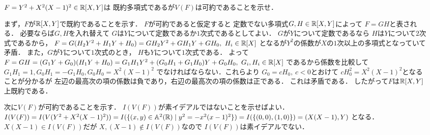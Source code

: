 \begin{prob}
  $F = Y^2 + X^2(X-1)^2 \in \mathbb{R}[X,Y] $は
  既約多項式であるが$V(F)$は可約であることを示せ．
\end{prob}
\begin{ans}
  まず，$F$が$\mathbb{R}[X,Y]$で既約であることを示す．
  $F$が可約であると仮定すると
  定数でない多項式$G,H \in \mathbb{R}[X,Y]$によって
  $F = GH$と表される．
  必要ならば$G,H$を入れ替えて
  $G$は$Y$について定数であるか$1$次式であるとしてよい．
  $G$が$Y$について定数であるなら
  $H$は$Y$について$2$次式であるから，
  $F = G(H_2Y^2 + H_1Y + H_0) = GH_2Y^2 + GH_1Y + GH_0 ,\ H_i \in \mathbb{R}[X] $
  となるが$Y^2$の係数が$X$の$1$次以上の多項式となっていて矛盾．
  また，$G$が$Y$について$1$次式のとき，
  $H$も$Y$について$1$次式である．
  よって
  $ F = GH = (G_1Y + G_0)(H_1Y + H_0)
  = G_1H_1 Y^2 + (G_0H_1 + G_1H_0) Y + G_0H_0, \ G_i, H_i \in \mathbb{R}[X] $
  であるから係数を比較して
  $G_1 H_1 = 1, G_0 H_1 = -G_1 H_0, G_0H_0 = X^2(X-1)^2 $
  でなければならない．これらより
  $ G_0 = c H_0 , \ c < 0$とおけて
  $c H_0^2 = X^2(X-1)^2 $となることが分かるが
  左辺の最高次の項の係数は負であり，右辺の最高次の項の係数は正である．
  これは矛盾である．
  したがって$F$は$\mathbb{R}[X,Y]$上既約である．
  
  次に$V(F)$が可約であることを示す．
  $I(V(F))$が素イデアルではないことを示せばよい．
  $I(V(F)) = I(V(Y^2 + X^2(X-1)^2))
  = I( \{ (x,y)\in\mathbb{A}^2(\mathbb{R}) \mid y^2 = -x^2(x-1)^2 \} )
  = I( \{ (0,0), (1,0) \} )
  = (X(X-1), Y) $
  となる．
  $X(X-1) \in I(V(F))$だが
  $X,(X-1) \not\in I(V(F)) $なので
  $I(V(F))$は素イデアルでない．
\end{ans}
